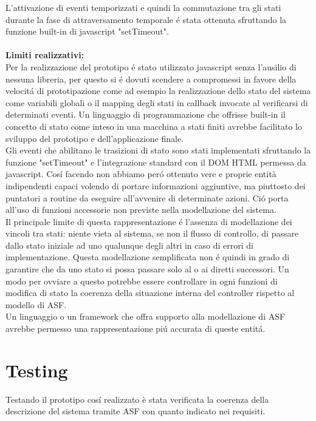 \documentclass{llncs}
\newcommand{\labelsec}[1]{\label{sec:#1}}
\begin{document}
L'attivazione di eventi temporizzati e quindi la commutazione tra gli stati durante la fase di attraversamento temporale \'e stata ottenuta sfruttando la funzione built-in di javascript "setTimeout".\\
\\
\textbf{Limiti realizzativi:}\\
Per la realizzazione del prototipo \'e stato utilizzato javascript senza l'ausilio di nessuna libreria, per questo si \'e dovuti scendere a compromessi in favore della velocit\'a di prototipazione come ad esempio la realizzazione dello stato del sistema come variabili globali o il mapping degli stati in callback invocate al verificarsi di determinati eventi. Un linguaggio di programmazione che offrisse built-in il concetto di stato come inteso in una macchina a stati finiti avrebbe facilitato lo sviluppo del prototipo e dell'applicazione finale. \\
Gli eventi che abilitano le trasizioni di stato sono stati implementati sfruttando la funzione "setTimeout" e l'integrazione standard con il DOM HTML permessa da javascript. Cos\'i facendo non abbiamo per\'o ottenuto vere e proprie entità indipendenti capaci volendo di portare informazioni aggiuntive, ma piuttosto dei puntatori a routine da eseguire all'avvenire di determinate azioni. Ci\'o porta all'uso di funzioni accessorie non previste nella modellazione del sistema.\\
Il principale limite di questa rappresentazione \'e l'assenza di modellazione dei vincoli tra stati: niente vieta al sistema, se non il flusso di controllo, di passare dallo stato iniziale ad uno qualunque degli altri in caso di errori di implementazione. Questa modellazione semplificata non \'e quindi in grado di garantire che da uno stato si possa passare solo al o ai diretti successori. Un modo per ovviare a questo potrebbe essere controllare in ogni funzioni di modifica di stato la coerenza della situazione interna del controller rispetto al modello di ASF.\\
Un linguaggio o un framework che offra supporto alla modellazione di ASF avrebbe permesso una rappresentazione pi\'u accurata di queste entit\'a. \\ 


\section{Testing}
\labelsec{testing}
Testando il prototipo cos\'i realizzato è stata verificata la coerenza della descrizione del sistema tramite ASF con quanto indicato nei requisiti. 
\end{document}
